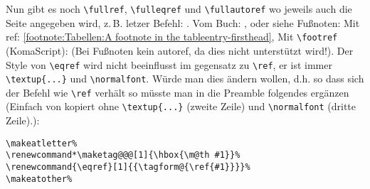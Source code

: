 Nun gibt es noch \verb|\fullref|, \verb|\fulleqref| und \verb|\fullautoref| wo jeweils auch die Seite angegeben wird, z.\,B. letzer Befehl: . Vom Buch: \cite{LabenbacherTeX}, oder siehe Fußnoten: Mit ref: \ref{footnote:Tabellen:A footnote in the tableentry-firsthead}, Mit \verb|\footref| (KomaScript):  (Bei Fußnoten kein autoref, da dies nicht unterstützt wird!). Der Style von \verb|\eqref| wird nicht beeinflusst im gegensatz zu \verb|\ref|, er ist immer \verb|\textup{...}| und \verb|\normalfont|. Würde man dies ändern wollen, d.h. so dass sich der Befehl wie \verb|\ref| verhält so müsste man in die Preamble folgendes ergänzen (Einfach von  kopiert ohne \verb|\textup{...}| (zweite Zeile) und \verb|\normalfont| (dritte Zeile).):%
\begin{lstlisting}[style=LaTeX, caption={\LaTeX-Code für \ldots{}.}, label={lst:introduction:3}]
\makeatletter%
\renewcommand*\maketag@@@[1]{\hbox{\m@th #1}}%
\renewcommand{\eqref}[1]{{\tagform@{\ref{#1}}}}%
\makeatother%
\end{lstlisting}


